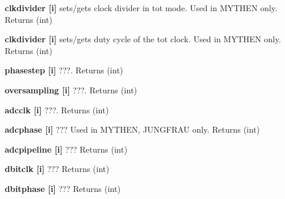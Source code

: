 \begin{DoxyItemize}
\item {\bfseries clkdivider \mbox{[}i\mbox{]}} sets/gets clock divider in tot mode. Used in MYTHEN only. {\ttfamily Returns} {\ttfamily }(int)
\end{DoxyItemize}


\begin{DoxyItemize}
\item {\bfseries clkdivider \mbox{[}i\mbox{]}} sets/gets duty cycle of the tot clock. Used in MYTHEN only. {\ttfamily Returns} {\ttfamily }(int)
\end{DoxyItemize}


\begin{DoxyItemize}
\item {\bfseries phasestep \mbox{[}i\mbox{]}} ???. {\ttfamily Returns} {\ttfamily }(int)
\end{DoxyItemize}


\begin{DoxyItemize}
\item {\bfseries oversampling \mbox{[}i\mbox{]}} ???. {\ttfamily Returns} {\ttfamily }(int)
\end{DoxyItemize}


\begin{DoxyItemize}
\item {\bfseries adcclk \mbox{[}i\mbox{]}} ???. {\ttfamily Returns} {\ttfamily }(int)
\end{DoxyItemize}


\begin{DoxyItemize}
\item {\bfseries adcphase \mbox{[}i\mbox{]}} ??? Used in MYTHEN, JUNGFRAU only. {\ttfamily Returns} {\ttfamily }(int)
\end{DoxyItemize}


\begin{DoxyItemize}
\item {\bfseries adcpipeline \mbox{[}i\mbox{]}} ??? {\ttfamily Returns} {\ttfamily }(int)
\end{DoxyItemize}


\begin{DoxyItemize}
\item {\bfseries dbitclk \mbox{[}i\mbox{]}} ??? {\ttfamily Returns} {\ttfamily }(int)
\end{DoxyItemize}


\begin{DoxyItemize}
\item {\bfseries dbitphase \mbox{[}i\mbox{]}} ??? {\ttfamily Returns} {\ttfamily }(int)
\end{DoxyItemize}


